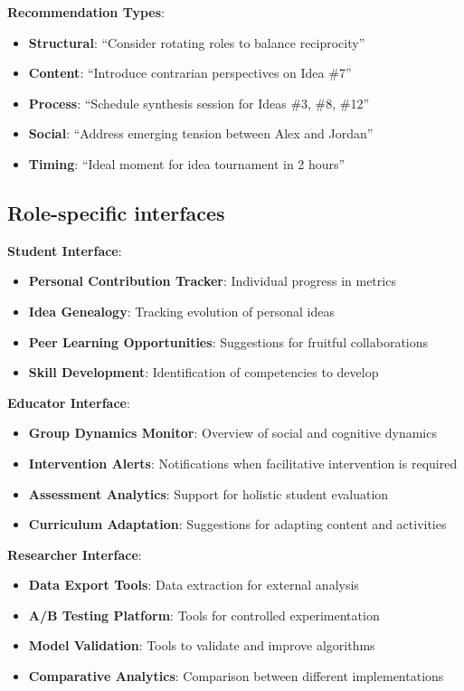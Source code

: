 \textbf{Recommendation Types}:

\begin{itemize}
	\item \textbf{Structural}: ``Consider rotating roles to balance reciprocity''
	\item \textbf{Content}: ``Introduce contrarian perspectives on Idea \#7''
	\item \textbf{Process}: ``Schedule synthesis session for Ideas \#3, \#8, \#12''
	\item \textbf{Social}: ``Address emerging tension between Alex and Jordan''
	\item \textbf{Timing}: ``Ideal moment for idea tournament in 2 hours''
\end{itemize}

\subsection{Role-specific interfaces}

\textbf{Student Interface}:
\begin{itemize}
	\item \textbf{Personal Contribution Tracker}: Individual progress in metrics
	\item \textbf{Idea Genealogy}: Tracking evolution of personal ideas
	\item \textbf{Peer Learning Opportunities}: Suggestions for fruitful collaborations
	\item \textbf{Skill Development}: Identification of competencies to develop
\end{itemize}

\textbf{Educator Interface}:
\begin{itemize}
	\item \textbf{Group Dynamics Monitor}: Overview of social and cognitive dynamics
	\item \textbf{Intervention Alerts}: Notifications when facilitative intervention is required
	\item \textbf{Assessment Analytics}: Support for holistic student evaluation
	\item \textbf{Curriculum Adaptation}: Suggestions for adapting content and activities
\end{itemize}

\textbf{Researcher Interface}:
\begin{itemize}
	\item \textbf{Data Export Tools}: Data extraction for external analysis
	\item \textbf{A/B Testing Platform}: Tools for controlled experimentation
	\item \textbf{Model Validation}: Tools to validate and improve algorithms
	\item \textbf{Comparative Analytics}: Comparison between different implementations
\end{itemize}

